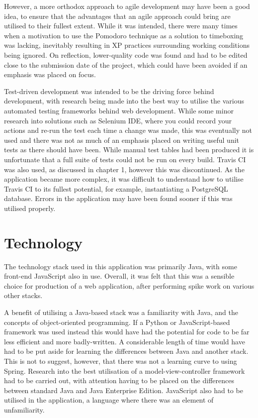 However, a more orthodox approach to agile development may have been a good idea, to ensure that the advantages that an agile approach could bring are utilised to their fullest extent. While it was intended, there were many times when a motivation to use the Pomodoro technique as a solution to timeboxing was lacking, inevitably resulting in XP practices surrounding working conditions being ignored. On reflection, lower-quality code was found and had to be edited close to the submission date of the project, which could have been avoided if an emphasis was placed on focus.

Test-driven development was intended to be the driving force behind development, with research being made into the best way to utilise the various automated testing frameworks behind web development. While some minor research into solutions such as Selenium IDE, where you could record your actions and re-run the test each time a change was made, this was eventually not used and there was not as much of an emphasis placed on writing useful unit tests as there should have been. While manual test tables had been produced it is unfortunate that a full suite of tests could not be run on every build. Travis CI was also used, as discussed in chapter 1, however this was discontinued. As the application became more complex, it was difficult to understand how to utilise Travis CI to its fullest potential, for example, instantiating a PostgreSQL database. Errors in the application may have been found sooner if this was utilised properly.

\section{Technology}

The technology stack used in this application was primarily Java, with some front-end JavaScript also in use. Overall, it was felt that this was a sensible choice for production of a web application, after performing spike work on various other stacks.

A benefit of utilising a Java-based stack was a familiarity with Java, and the concepts of object-oriented programming. If a Python or JavaScript-based framework was used instead this would have had the potential for code to be far less efficient and more badly-written. A considerable length of time would have had to be put aside for learning the differences between Java and another stack. This is not to suggest, however, that there was not a learning curve to using Spring. Research into the best utilisation of a model-view-controller framework had to be carried out, with attention having to be placed on the differences between standard Java and Java Enterprise Edition. JavaScript also had to be utilised in the application, a language where there was an element of unfamiliarity.


